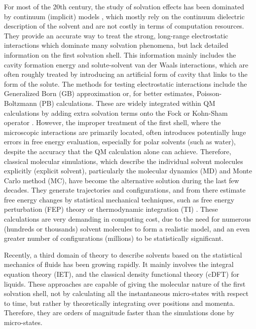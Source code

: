 For most of the 20th century, the study of solvation effects has been
dominated by continuum (implicit) models \citep{Jensen,Cramer_1999},
which mostly rely on the continuum dielectric description of the solvent
and are not costly in terms of computation resources. They provide
an accurate way to treat the strong, long-range electrostatic interactions
which dominate many solvation phenomena, but lack detailed information
on the first solvation shell. This information mainly includes the
cavity formation energy and solute-solvent van der Waals interactions,
which are often roughly treated by introducing an artificial form
of cavity that links to the form of the solute. The methods for testing
electrostatic interactions include the Generalized Born (GB) approximation
or, for better estimates, Poisson-Boltzmann (PB) calculations. These
are widely integrated within \acs{QM} calculations by adding extra
solvation terms onto the Fock or Kohn-Sham operator \citep{Tomasi_1994_implicit_model,tomasi_quantum_2005}.
However, the improper treatment of the first shell, where the microscopic
interactions are primarily located, often introduces potentially huge
errors in free energy evaluation, especially for polar solvents (such
as water), despite the accuracy that the \acs{QM} calculation alone
can achieve. Therefore, classical molecular simulations, which describe
the individual solvent molecules explicitly (explicit solvent), particularly
the molecular dynamics (\acs{MD}) and Monte Carlo method (\acs{MC}),
have become the alternative solution during the last few decades.
They generate trajectories and configurations, and from there estimate
free energy changes by statistical mechanical techniques, such as
free energy perturbation (FEP) theory or thermodynamic integration
(TI) \citep{Jorgensen_1995_MC}. These calculations are very demanding
in computing cost, due to the need for numerous (hundreds or thousands)
solvent molecules to form a realistic model, and an even greater number
of configurations (millions) to be statistically significant.

Recently, a third domain of theory to describe solvents based on the
statistical mechanics of fluids has been growing rapidly. It mainly
involves the integral equation theory (\acs{IET}), and the classical
density functional theory (c\acs{DFT}) for liquids. These approaches
are capable of giving the molecular nature of the first solvation
shell, not by calculating all the instantaneous micro-states with
respect to time, but rather by theoretically integrating over positions
and momenta. Therefore, they are orders of magnitude faster than the
simulations done by micro-states.


